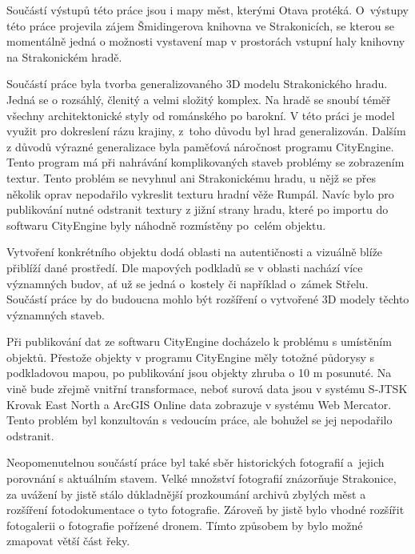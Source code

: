 \documentclass[thesis=M,czech]{FITthesis}[2012/06/26]
\begin{document}
Součástí výstupů této práce jsou i mapy měst, kterými Otava protéká.  O~výstupy této práce projevila zájem Šmidingerova knihovna ve Strakonicích, se kterou se momentálně jedná o možnosti vystavení map v prostorách vstupní haly knihovny na Strakonickém hradě. 

Součástí práce byla tvorba generalizovaného 3D modelu Strakonického hradu. Jedná se o rozsáhlý, členitý a velmi složitý komplex. Na hradě se snoubí téměř všechny architektonické styly od románského po barokní. V této práci je model využit pro dokreslení rázu krajiny, z~toho důvodu byl hrad generalizován. Dalším z důvodů výrazné generalizace byla paměťová náročnost programu CityEngine. Tento program má při nahrávání komplikovaných staveb problémy se zobrazením textur. Tento problém se nevyhnul ani Strakonickému hradu, u nějž se přes několik oprav nepodařilo vykreslit texturu hradní věže Rumpál. Navíc bylo pro publikování nutné odstranit textury z jižní strany hradu, které po importu do softwaru CityEngine byly náhodně rozmístěny po~celém objektu.



Vytvoření konkrétního objektu dodá oblasti na autentičnosti a vizuálně blíže přiblíží dané prostředí. Dle mapových podkladů se v oblasti nachází více významných budov, ať už se jedná o~kostely či například o~zámek Střelu. Součástí práce by do budoucna mohlo být rozšíření o vytvořené 3D modely těchto významných staveb. 

Při publikování dat ze softwaru CityEngine docházelo k problému s umístěním objektů. Přestože objekty v programu CityEngine měly totožné půdorysy s podkladovou  mapou, po publikování jsou objekty zhruba o 10 m posunuté. Na vině bude zřejmě vnitřní transformace, neboť surová data jsou v systému S-JTSK Krovak East North a ArcGIS Online data zobrazuje v systému Web Mercator. Tento problém byl konzultován s vedoucím práce, ale bohužel se jej nepodařilo odstranit. 

Neopomenutelnou součástí práce byl také sběr historických fotografií a~jejich porovnání s aktuálním stavem. Velké množství fotografií znázorňuje Strakonice, za uvážení by jistě stálo důkladnější prozkoumání archivů zbylých měst a rozšíření fotodokumentace o tyto fotografie. Zároveň by jistě bylo vhodné rozšířit fotogalerii o fotografie pořízené dronem. Tímto způsobem by bylo možné zmapovat větší část řeky.
\end{document}
